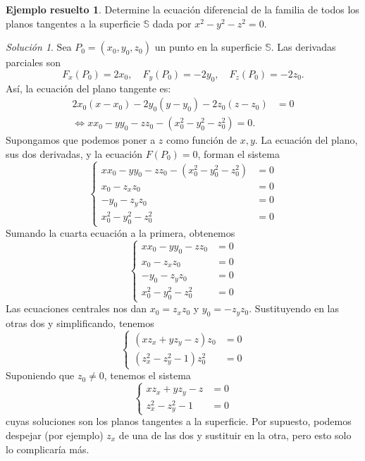 \documentclass[11pt,letterpaper,draft]{report}
\theoremstyle{plain}
\theoremstyle{definition}
\newtheorem{solved}[theorem]{Ejemplo resuelto}
\theoremstyle{remark}
\newtheorem*{solution}{Solución}
\newcommand\<{\langle}
\renewcommand\>{\rangle}
\begin{document}
\begin{solved}
  Determine la ecuación diferencial de la familia de todos los planos tangentes
  a la superficie $\mathbb{S}$ dada por $x^2 - y^2 - z^2 = 0$.

  \begin{solution}
    Sea $P_0=(x_0,y_0,z_0)$ un punto en la superficie $\mathbb{S}$.
    Las derivadas parciales son
    \[
    F_x(P_0) = 2x_0, \quad F_y(P_0) = -2y_0, \quad F_z(P_0) = -2z_0.
    \]
    Así, la ecuación del plano tangente es:
    \begin{align*}
      2x_0(x-x_0) - 2y_0(y-y_0) - 2z_0(z-z_0) &= 0\\
      \iff xx_0 - yy_0 - zz_0 - (x_0^2 - y_0^2 - z_0^2) = 0.
    \end{align*}
    Supongamos que podemos poner a \(z\) como función de \(x,y\).
    La ecuación del plano, sus dos derivadas, y la ecuación \(F(P_0)=0\),
    forman el sistema
    \begin{equation}
      \left\{
        \begin{aligned}
          xx_0 - yy_0 - zz_0 - (x_0^2 - y_0^2 - z_0^2) &= 0 \\
          x_0 - z_x z_0 &= 0 \\
          -y_0 - z_y z_0 &= 0 \\
          x_0^2 - y_0^2 - z_0^2 &= 0 
        \end{aligned}
      \right.
    \end{equation}
    Sumando la cuarta ecuación a la primera, obtenemos
    \begin{equation}
      \left\{
        \begin{aligned}
          xx_0 - yy_0 - zz_0 &= 0 \\
          x_0 - z_x z_0 &= 0 \\
          -y_0 - z_y z_0 &= 0 \\
          x_0^2 - y_0^2 - z_0^2 &= 0 
        \end{aligned}
      \right.
    \end{equation}
    Las ecuaciones centrales nos dan \(x_0 = z_x z_0\) y
    \(y_0 = -z_y z_0\). Sustituyendo en las otras dos y simplificando, tenemos
    \begin{equation}
      \left\{
        \begin{aligned}
          (xz_x + yz_y - z)z_0 &= 0 \\
          (z_x^{2} - z_y^{2} - 1)z_0^2 &= 0 
        \end{aligned}
      \right.
    \end{equation}
    Suponiendo que \(z_0\neq 0\), tenemos el sistema
    \begin{equation}
      \left\{
        \begin{aligned}
          xz_x + yz_y - z &= 0 \\
          z_x^{2} - z_y^{2} - 1 &= 0 
        \end{aligned}
      \right.
    \end{equation}
    cuyas soluciones son los planos tangentes a la superficie. Por
    supuesto, podemos despejar (por ejemplo) \(z_x\) de una de las dos
    y sustituir en la otra, pero esto solo lo complicaría más.
  \end{solution}
\end{solved}
\end{document}
